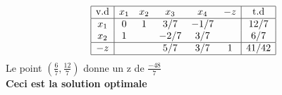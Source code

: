 \documentclass{article}
\begin{document}
\begin{center}
   \begin{equation*}
      \begin{array}{|c|ccccc|c|}
         \hline
         \text{v.d} & x_1 & x_2 & x_3  & x_4  & -z & \text{t.d} \\ \hline
         x_1        & 0   & 1   & 3/7  & -1/7 &    & 12/7       \\ 
         x_2        & 1   &     & -2/7 & 3/7  &    & 6/7        \\ \hline 
         -z         &     &     & 5/7  & 3/7  & 1  & 41/42      \\ \hline
      \end{array}
   \end{equation*}
   Le point $(\frac{6}{7},\frac{12}{7})$ donne un z de $\frac{-48}{7}$ \\ 
   \vspace{5mm} %
   \textbf{Ceci est la solution optimale}
   
\end{center}
\pagebreak
\end{document}
